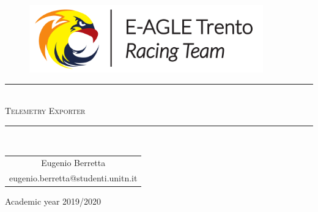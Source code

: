 \pagestyle{plain}

\thispagestyle{empty}

\begin{center}
  \begin{figure}[h!]
    \centerline{\includegraphics[width=0.9\textwidth]{images/Logo_Anteriore.pdf}}
  \end{figure}
    
    \vspace{0.7 cm} 
    
    \rule{\linewidth}{0.2 mm} \\[1 cm]
  
  \Huge\textsc{Telemetry Exporter}
  
  \vspace{0.7 cm} 
  \rule{\linewidth}{0.2 mm} \\[1 cm]
  \vspace{2 cm}
    \begin{center}
        \begin{tabular}{c}
            Eugenio Berretta\\
            eugenio.berretta@studenti.unitn.it
        \end{tabular}
    \end{center}

  \vspace{4 cm} 

  \Large{Academic year 2019/2020}
  \\[1cm]
  
\end{center}

